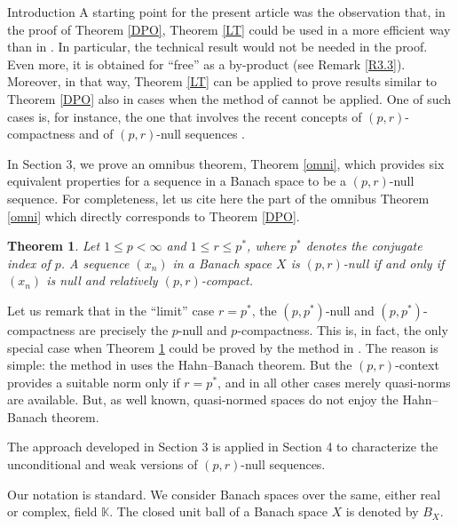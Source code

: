 \documentclass[a4paper,11pt]{amsart}
\newtheorem{thm}[prop]{Theorem}
\theoremstyle{definition}
\theoremstyle{definition}
\theoremstyle{definition}
\begin{document}
\begin{section}{Introduction}
A starting point for the present article was the observation that, in the proof of Theorem \ref{DPO}, Theorem \ref{LT} could be used in a more efficient way than in \cite{LT}. In particular, the technical result \cite[Proposition 1.5]{LT} would not be needed in the proof. Even more, it is obtained for ``free'' as a by-product (see Remark \ref{R3.3}). Moreover, in that way, Theorem \ref{LT} can be applied to prove results similar to Theorem \ref{DPO} also in cases when the method of \cite{O-JF} cannot be applied. One of such cases is, for instance, the one that involves the recent concepts of $(p,r)$-compactness \cite{ALO}  and of $(p,r)$-null sequences \cite{AO1}.

In Section 3, we prove an omnibus theorem, Theorem \ref{omni}, which provides six equivalent properties  for a sequence in a Banach space to be a ${{(p,r)}}$-null sequence. For completeness, let us cite here the part of the omnibus Theorem \ref{omni} which directly corresponds to Theorem \ref{DPO}.

\begin{thm}\label{th1.3}
Let $1 \leq p < \infty$ and $1\leq r \leq {p^{\ast}}$, where ${p^{\ast}}$ denotes the conjugate index of $p$. A sequence $(x_n)$ in a Banach space $X$ is ${{(p,r)}}$-null if and only if $(x_n)$ is null and relatively ${{(p,r)}}$-compact.
\end{thm}

Let us remark that in the ``limit'' case $r={p^{\ast}}$, the $(p,{p^{\ast}})$-null and $(p,{p^{\ast}})$-compactness are precisely the $p$-null and $p$-compactness. This is, in fact, the only special case when Theorem \ref{th1.3} could be proved by the method in \cite{O-JF}. The reason is simple: the method in \cite{O-JF} uses the Hahn--Banach  theorem. But the ${{(p,r)}}$-context provides a suitable norm only if $r= {p^{\ast}}$, and in all other cases merely quasi-norms are available. But, as well known, quasi-normed spaces do not enjoy the Hahn--Banach theorem.

The approach developed in Section 3 is applied in Section 4 to characterize the unconditional and weak versions of ${{(p,r)}}$-null sequences.

Our notation is standard. We consider Banach spaces over the same, either real or complex, field $\mathbb K$. The closed unit ball of a Banach space $X$ is denoted by $B_X$. 


\end{section}
\end{document}
